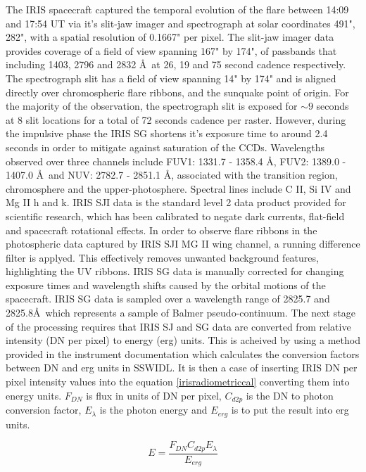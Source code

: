 The IRIS spacecraft captured the temporal evolution of the flare between 14:09 and 17:54 UT via it's slit-jaw imager and spectrograph at solar coordinates 491", 282", with a spatial resolution of 0.1667" per pixel. The slit-jaw imager data provides coverage of a field of view spanning 167" by 174", of passbands that including 1403, 2796 and 2832 \AA\ at 26, 19 and 75 second cadence respectively. The spectrograph slit has a field of view spanning 14" by 174" and is aligned directly over chromospheric flare ribbons, and the sunquake point of origin. For the majority of the observation, the spectrograph slit is exposed for $\sim9$ seconds at 8 slit locations for a total of 72 seconds cadence per raster. However, during the impulsive phase the IRIS SG shortens it's exposure time to around 2.4 seconds in order to mitigate against saturation of the CCDs. Wavelengths observed over three channels include FUV1: 1331.7 - 1358.4 \AA, FUV2: 1389.0 - 1407.0 \AA\ and NUV: 2782.7 - 2851.1 \AA, associated with the transition region, chromosphere and the upper-photosphere. Spectral lines include C II, Si IV and Mg II h and k. IRIS SJI data is the standard level 2 data product provided for scientific research, which has been calibrated to negate dark currents, flat-field and spacecraft rotational effects. In order to observe flare ribbons in the photospheric data captured by IRIS SJI MG II wing channel, a running difference filter is applyed. This effectively removes unwanted background features, highlighting the UV ribbons. IRIS SG data is manually corrected for changing exposure times and wavelength shifts caused by the orbital motions of the spacecraft. IRIS SG data is sampled over a wavelength range of 2825.7 and 2825.8\AA\ which represents a sample of Balmer pseudo-continuum. The next stage of the processing requires that IRIS SJ and SG data are converted from relative intensity (DN per pixel) to energy (erg) units. This is acheived by using a method provided in the instrument documentation \citep{2014SoPh..289.2733D} which calculates the conversion factors between DN and erg units in SSWIDL. It is then a case of inserting IRIS DN per pixel intensity values into the equation \ref{irisradiometriccal} converting them into energy units. $F_{DN}$ is flux in units of DN per pixel, $C_{d2p}$ is the DN to photon conversion factor, $E_{\lambda}$ is the photon energy and $E_{erg}$ is to put the result into erg units.  

\begin{equation}\label{irisradiometriccal}
E = \frac{F_{DN}  C_{d2p} E_{\lambda}}{E_{erg}}
\end{equation}



